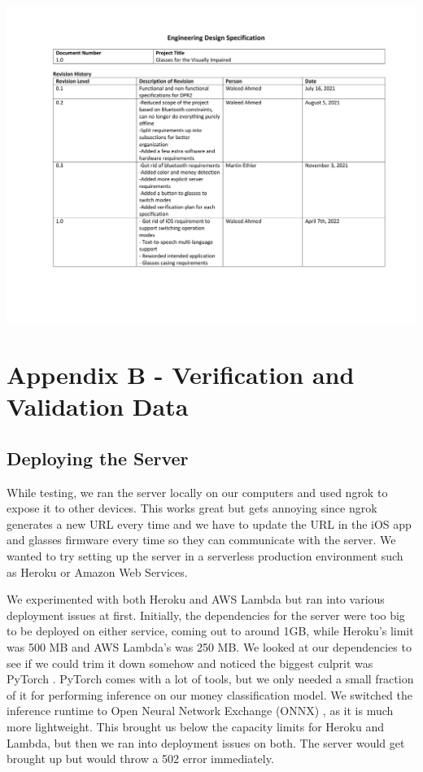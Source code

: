 \documentclass[a4paper,11pt]{article}
\begin{document}
\begin{landscape}
\begin{center}
        \newpage
        \includegraphics[page=6,width={0.86\linewidth}]{pdf/eds_1.0.pdf}
    \end{center}
\end{landscape}


\newpage
\section{Appendix B - Verification and Validation Data}
\subsection{Deploying the Server}
While testing, we ran the server locally on our computers and used ngrok \cite{ngrok} to expose it to other devices. This works great but gets annoying since ngrok generates a new URL every time and we have to update the URL in the iOS app and glasses firmware every time so they can communicate with the server. We wanted to try setting up the server in a serverless production environment such as Heroku \cite{heroku} or Amazon Web Services.

We experimented with both Heroku and AWS Lambda \cite{aws-lambda} but ran into various deployment issues at first. Initially, the dependencies for the server were too big to be deployed on either service, coming out to around 1GB, while Heroku's limit was 500 MB and AWS Lambda's was 250 MB. We looked at our dependencies to see if we could trim it down somehow and noticed the biggest culprit was PyTorch \cite{pytorch}. PyTorch comes with a lot of tools, but we only needed a small fraction of it for performing inference on our money classification model. We switched the inference runtime to Open Neural Network Exchange (ONNX) \cite{onnx}, as it is much more lightweight. This brought us below the capacity limits for Heroku and Lambda, but then we ran into deployment issues on both. The server would get brought up but would throw a 502 error immediately. 
\end{document}
